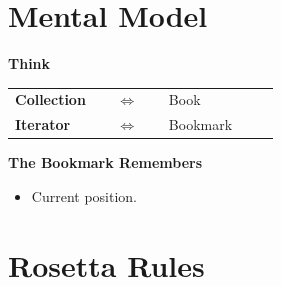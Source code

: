 \documentclass[11pt,a4paper]{book}
\begin{document}













\section{Mental Model}

\textcolor{RosettaBlue}{\textbf{Think}}

\medskip

\begin{center}

\renewcommand{\arraystretch}{1.6}

\begin{tabular}{p{0.32\linewidth} c p{0.42\linewidth}}

\textbf{\textcolor{RosettaBlue}{Collection}}
&
$\Longleftrightarrow$
&
\textcolor{RosettaDeepGreen}{Book}

\\[0.5em]

\textbf{\textcolor{RosettaBlue}{Iterator}}
&
$\Longleftrightarrow$
&
\textcolor{RosettaDeepGreen}{Bookmark}

\end{tabular}

\end{center}

\medskip

\textcolor{RosettaRoyalPurple}{\textbf{The Bookmark Remembers}}

\begin{itemize}[leftmargin=2em]
    \item Current position.
\end{itemize}

\section{Rosetta Rules}
\end{document}
